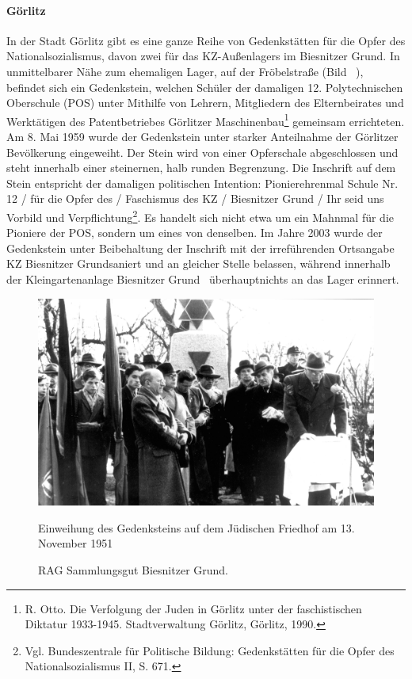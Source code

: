 \paragraph{Görlitz}
In der Stadt Görlitz gibt es eine ganze Reihe von Gedenkstätten für die Opfer des Nationalsozialismus, davon zwei für das KZ-Außenlagers im Biesnitzer Grund. 
In unmittelbarer Nähe zum ehemaligen Lager, auf der Fröbelstraße (Bild ~), befindet sich ein Gedenkstein, welchen Schüler der damaligen 12. Polytechnischen Oberschule (POS) unter Mithilfe von \glqq Lehrern, Mitgliedern des Elternbeirates und Werktätigen des Patentbetriebes Görlitzer Maschinenbau\grqq\footnote{R. Otto. Die Verfolgung der Juden in Görlitz unter der faschistischen Diktatur
1933-1945. Stadtverwaltung Görlitz, Görlitz, 1990.}  gemeinsam errichteten. Am 8. Mai 1959 wurde der Gedenkstein unter starker Anteilnahme der Görlitzer Bevölkerung eingeweiht. Der Stein wird von einer Opferschale abgeschlossen und steht innerhalb einer steinernen, halb runden Begrenzung. Die Inschrift auf dem Stein entspricht der damaligen politischen Intention: \glqq Pionierehrenmal Schule Nr. 12 / für die Opfer des / Faschismus des KZ / Biesnitzer Grund / Ihr seid uns Vorbild und Verpflichtung\grqq\footnote{Vgl. Bundeszentrale für Politische Bildung: Gedenkstätten für die Opfer des Nationalsozialismus II, S. 671.}. Es handelt sich nicht etwa um ein Mahnmal für die Pioniere der POS, sondern um eines von denselben. Im Jahre 2003 wurde der Gedenkstein unter Beibehaltung der Inschrift mit der irreführenden Ortsangabe \glqq KZ Biesnitzer Grund\grqq saniert und an gleicher Stelle belassen, während innerhalb der Kleingartenanlage \glqq Biesnitzer Grund\grqq~ überhauptnichts an das Lager erinnert. 


\begin{figure}[htb]
    \includegraphics[width=\linewidth]{images/nk01}
    \caption[Einweihung des Gedenksteins auf dem Jüdischen Friedhof]{RAG Sammlungsgut Biesnitzer Grund.}{Einweihung des Gedenksteins auf dem Jüdischen Friedhof am 13. November 1951}
    \label{judfriedeinweihung}
\end{figure}



